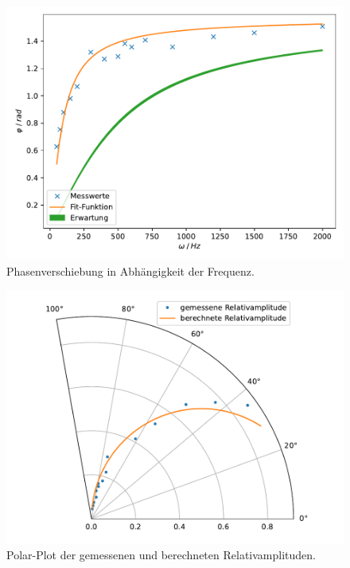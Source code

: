 \begin{figure}
    \centering
    \includegraphics[width=\textwidth]{build/plt/3_rc_via_phi.pdf}
    \caption{Phasenverschiebung in Abhängigkeit der Frequenz.}
    \label{fig:3_rc_via_phi}
\end{figure}

\begin{figure}
    \centering
    \includegraphics[width=\textwidth]{build/plt/3_polar.pdf}
    \caption{Polar-Plot der gemessenen und berechneten Relativamplituden.}
    \label{fig:3_polar}
\end{figure}
